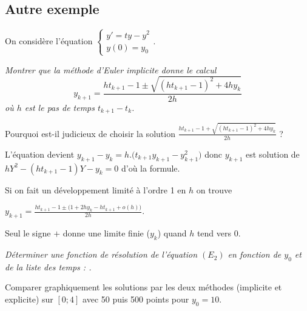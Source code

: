 \subsection{Autre exemple}
On considère l'équation $\displaystyle \left\{\begin{matrix} y' = ty - y^2\\ y(0) = y_0\end{matrix}\right.$.
\begin{Exercise}\it
Montrer que la méthode d'Euler implicite donne le calcul 
\[y_{k+1} = \frac{ht_{k+1} - 1 \pm \sqrt{(ht_{k+1} - 1)^2+4hy_k}}{2h}\]
où $h$ est le pas de temps $t_{k+1}-t_k$.

Pourquoi est-il judicieux de choisir la solution
$\displaystyle \frac{ht_{k+1} - 1 + \sqrt{(ht_{k+1} - 1)^2+4hy_k}}{2h}$ ?
\end{Exercise}
\begin{Answer}

L'équation devient $y_{k+1} - y_k = h.\bigl(t_{k+1}y_{k+1} -y_{k+1}^2\bigr)$ donc $y_{k+1}$ est solution de 
$hY^2 - (ht_{k+1} - 1)Y - y_k=0$ d'où la formule.

Si on fait un développement limité à l'ordre 1 en $h$ on trouve

$\displaystyle y_{k+1} = \frac{ht_{k+1} - 1 \pm \bigl(1+2hy_k-ht_{k+1} + o(h)\bigr)}{2h}$. 

Seul le signe $+$ donne une limite finie ($y_k$) quand $h$ tend vers 0.
\end{Answer}
\begin{Exercise}\it
Déterminer une fonction de résolution de l'équation $(E_{2})$ en fonction de $y_0$ et de la liste des temps : . 

Comparer graphiquement les solutions par les deux méthodes (implicite et explicite) sur $[0;4]$ avec 50 puis 500 points pour $y_0 = 10$.
\end{Exercise}
